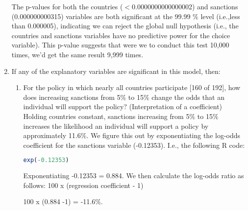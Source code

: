 \documentclass[12pt,letterpaper]{article}
\begin{document}
\begin{enumerate}
	The p-values for both the countries ($<$0.0000000000000002) and sanctions (0.000000000315) variables are both significant at the 99.99 $\%$ level (i.e.,less than 0.000005), indicating we can reject the global null hypothesis (i.e., the countries and sanctions variables have no predictive power for the choice variable). This p-value suggests that were we to conduct this test 10,000 times, we'd get the same result 9,999 times.
	\vspace{.5cm}
	\item
	If any of the explanatory variables are significant in this model, then:
	\begin{enumerate}
		\item
		For the policy in which nearly all countries participate [160 of 192], how does increasing sanctions from 5\% to 15\% change the odds that an individual will support the policy? (Interpretation of a coefficient)
		\vspace{.35cm}
		Holding countries constant, sanctions increasing from 5$\%$ to 15$\%$ increases the likelihood an individual will support a policy by approximately 11.6$\%$. 
		\vspace{.35cm}
		We figure this out by exponentiating the log-odds coefficient for the sanctions variable (-0.12353). I.e., the following R code:
		\vspace{.35cm}
		\begin{lstlisting}[language=R]
		exp(-0.12353)\end{lstlisting}
		Exponentiating -0.12353 = 0.884. We then calculate the log-odds ratio as follows: 100 x (regression coefficient - 1)
		
		\vspace{.35cm}
		
		100 x (0.884 -1) = -11.6$\%$. 
		
		\vspace{.35cm}
		

\end{enumerate}
\end{enumerate}
\end{document}
